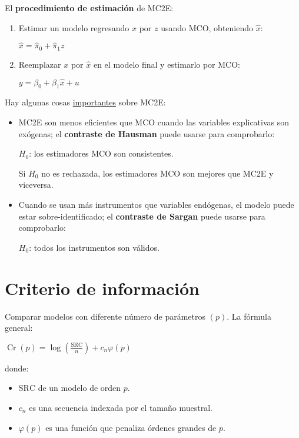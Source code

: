 \documentclass[10pt, a4paper, landscape]{article}
\DeclareMathOperator{\Cr}{Cr}
\newcommand{\SSR}{\text{SRC}}
\begin{document}
\begin{multicols}{3}
\begin{itemize}[leftmargin=*]
	El \textbf{procedimiento de estimación} de MC2E:
	\begin{enumerate}[leftmargin=*]
		\item Estimar un modelo regresando \( x \) por \( z \) usando MCO, obteniendo \( \hat{x} \):
		\begin{center}
			\( \hat{x} = \hat{\pi}_{0} + \hat{\pi}_{1} z \)
		\end{center}
		\item Reemplazar \( x \) por \( \hat{x} \) en el modelo final y estimarlo por MCO:
		\begin{center}
			\( y = \beta_{0} + \beta_{1} \hat{x}+ u \)
		\end{center}
	\end{enumerate}
	Hay algunas cosas \underline{importantes} sobre MC2E:
	\begin{itemize}[leftmargin=*]
		\item MC2E son menos eficientes que MCO cuando las variables explicativas son exógenas; el \textbf{contraste de Hausman} puede usarse para comprobarlo:
		\begin{center}
			\( H_{0} \): los estimadores MCO son consistentes.
		\end{center}
		Si \( H_{0} \) no es rechazada, los estimadores MCO son mejores que MC2E y viceversa.
		\item Cuando se usan más instrumentos que variables endógenas, el modelo puede estar sobre-identificado; el \textbf{contraste de Sargan} puede usarse para comprobarlo:
		\begin{center}
			\( H_{0} \): todos los instrumentos son válidos.
		\end{center}
	\end{itemize}
\end{itemize}

\columnbreak

\section*{Criterio de información}

Comparar modelos con diferente número de parámetros \( (p) \). La fórmula general:

\begin{center}
	\( \Cr(p) = \log(\frac{\SSR}{n}) + c_{n} \varphi(p) \)
\end{center}

donde:

\begin{itemize}[leftmargin=*]
	\item \( \SSR \) de un modelo de orden \( p \).
	\item \( c_{n} \) es una secuencia indexada por el tamaño muestral.
	\item \( \varphi(p) \) es una función que penaliza órdenes grandes de \( p \).
\end{itemize}


\end{multicols}
\end{document}
